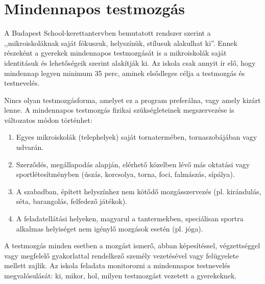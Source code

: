 \section{Mindennapos testmozgás}
\label{sec:mindennapos-testmozgas}

A Budapest School-kerettantervben bemutatott rendszer szerint a
,,mikroiskoláknak saját fókuszuk, helyszínük, stílusuk alakulhat
ki''. Ennek részeként a gyerekek mindennapos testmozgását is a
mikroiskolák saját\linebreak
identitásuk és lehetőségeik szerint alakítják ki. Az iskola csak annyit ír elő, hogy mindennap legyen minimum 35 perc, aminek elsődleges célja a testmozgás és testnevelés.

Nincs olyan testmozgásforma, amelyet ez a program preferálna, vagy amely kizárt lenne. A mindennapos testmozgás fizikai szükségleteinek megszervezése is változatos módon történhet:
\begin{enumerate}
    \item Egyes mikroiskolák (telephelyek) saját tornatermében, tornaszobájában vagy udvarán.
    \item Szerződés, megállapodás alapján, elérhető közelben lévő más oktatási vagy sportlétesítményben (úszás, korcsolya, torna, foci, falmászás, sípálya).
    \item A szabadban, épített helyszínhez nem kötődő mozgásszervezés (pl. kirándulás, séta, barangolás, felfedező játékok).
    \item A feladatellátási helyeken, magyarul a tantermekben, speciálisan sportra alkalmas helyiséget nem igénylő mozgások esetén (pl. jóga).
\end{enumerate}

A testmozgás minden esetben a mozgást ismerő, abban képesítéssel, végzettséggel vagy megfelelő gyakorlattal rendelkező személy vezetésével vagy felügyelete mellett zajlik. Az iskola feladata monitorozni a mindennapos testnevelés megvalósulását: ki, mikor, hol, milyen testmozgást vezetett a gyerekeknek.
